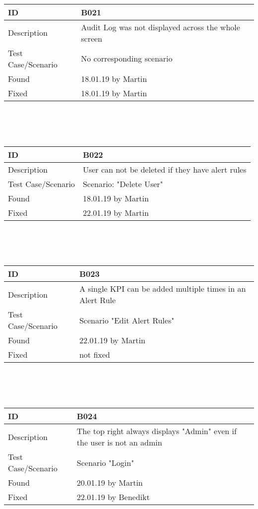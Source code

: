 \documentclass{scrreprt}
\begin{document}
\\ \\ \\
\begin{tabularx}{12cm}{l|X}
ID					& B021  \\
\hline
Description 		& 
Audit Log was not displayed across the whole screen\\
\hline
Test Case/Scenario	& No corresponding scenario  \\
\hline
Found				& 18.01.19 by Martin  \\
\hline
Fixed				& 18.01.19 by Martin \\ 
\end{tabularx}
\\ \\ \\
\begin{tabularx}{12cm}{l|X}
ID					& B022  \\
\hline
Description 		& 
User can not be deleted if they have alert rules\\
\hline
Test Case/Scenario	& Scenario: "Delete User"  \\
\hline
Found				& 18.01.19 by Martin  \\
\hline
Fixed				& 22.01.19 by Martin \\ 
\end{tabularx}
\\ \\ \\
\begin{tabularx}{12cm}{l|X}
ID					& B023  \\
\hline
Description 		& 
A single KPI can be added multiple times in an Alert Rule\\
\hline
Test Case/Scenario	& Scenario "Edit Alert Rules" \\
\hline
Found				& 22.01.19 by Martin  \\
\hline
Fixed				& not fixed \\ 
\end{tabularx}
\\ \\ \\
\begin{tabularx}{12cm}{l|X}
ID					& B024  \\
\hline
Description 		& 
The top right always displays "Admin" even if the user is not an admin\\
\hline
Test Case/Scenario	& Scenario "Login"  \\
\hline
Found				& 20.01.19 by Martin  \\
\hline
Fixed				& 22.01.19 by Benedikt\\ 
\end{tabularx}
\end{document}
